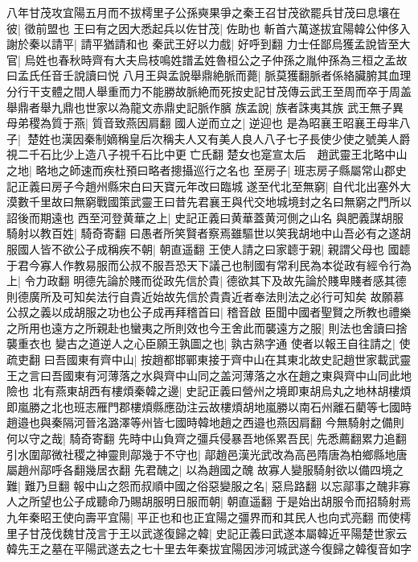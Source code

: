 八年甘茂攻宜陽五月而不拔樗里子公孫奭果爭之秦王召甘茂欲罷兵甘茂曰息壤在彼|{
	徵前盟也
	}
王曰有之因大悉起兵以佐甘茂|{
	佐助也
	}
斬首六萬遂拔宜陽韓公仲侈入謝於秦以請平|{
	請平猶請和也
	}
秦武王好以力戲|{
	好呼到翻
	}
力士任鄙烏獲孟說皆至大官|{
	烏姓也春秋時齊有大夫烏枝鳴姓譜孟姓魯桓公之子仲孫之胤仲孫為三桓之孟故曰孟氏任音壬說讀曰悦
	}
八月王與孟說舉鼎絶脈而薨|{
	脈莫獲翻脈者係絡臟腑其血理分行干支體之間人舉重而力不能勝故脈絶而死按史記甘茂傳云武王至周而卒于周盖舉鼎者舉九鼎也世家以為龍文赤鼎史記脈作臏
	}
族孟說|{
	族者誅夷其族
	}
武王無子異母弟稷為質于燕|{
	質音致燕因肩翻
	}
國人逆而立之|{
	逆迎也
	}
是為昭襄王昭襄王母芈八子|{
	楚姓也漢因秦制嫡稱皇后次稱夫人又有美人良人八子七子長使少使之號美人爵視二千石比少上造八子視千石比中更亡氏翻
	}
楚女也寔宣太后　趙武靈王北略中山之地|{
	略地之師速而疾杜預曰略者摠攝巡行之名也
	}
至房子|{
	班志房子縣屬常山郡史記正義曰房子今趙州縣宋白曰天寶元年改曰臨城
	}
遂至代北至無窮|{
	自代北出塞外大漠數千里故曰無窮戰國策武靈王曰昔先君襄王與代交地城境封之名曰無窮之門所以詔後而期遠也
	}
西至河登黄華之上|{
	史記正義曰黄華蓋黄河側之山名
	}
與肥義謀胡服騎射以教百姓|{
	騎奇寄翻
	}
曰愚者所笑賢者察焉雖驅世以笑我胡地中山吾必有之遂胡服國人皆不欲公子成稱疾不朝|{
	朝直遥翻
	}
王使人請之曰家聼于親|{
	親謂父母也
	}
國聼于君今寡人作教易服而公叔不服吾恐天下議己也制國有常利民為本從政有經令行為上|{
	令力政翻
	}
明德先論於賤而從政先信於貴|{
	德欲其下及故先論於賤卑賤者感其德則德廣所及可知矣法行自貴近始故先信於貴貴近者奉法則法之必行可知矣
	}
故願慕公叔之義以成胡服之功也公子成再拜稽首曰|{
	稽音啟
	}
臣聞中國者聖賢之所教也禮樂之所用也遠方之所親赴也蠻夷之所則效也今王舍此而襲遠方之服|{
	則法也舍讀曰捨襲重衣也
	}
變古之道逆人之心臣願王孰圖之也|{
	孰古熟字通
	}
使者以報王自往請之|{
	使疏吏翻
	}
曰吾國東有齊中山|{
	按趙都邯鄲東接于齊中山在其東北故史記趙世家載武靈王之言曰吾國東有河薄落之水與齊中山同之盖河薄落之水在趙之東與齊中山同此地險也
	}
北有燕東胡西有樓煩秦韓之邊|{
	史記正義曰營州之境即東胡烏丸之地林胡樓煩即嵐勝之北也班志雁門郡樓煩縣應劭注云故樓煩胡地嵐勝以南石州離石藺等七國時趙邉也與秦隔河晉洺潞澤等州皆七國時韓地趙之西邉也燕因肩翻
	}
今無騎射之備則何以守之哉|{
	騎奇寄翻
	}
先時中山負齊之彊兵侵暴吾地係累吾民|{
	先悉薦翻累力追翻
	}
引水圍鄗微社稷之神靈則鄗幾于不守也|{
	鄗趙邑漢光武改為高邑隋唐為柏鄉縣地唐屬趙州鄗呼各翻幾居衣翻
	}
先君醜之|{
	以為趙國之醜
	}
故寡人變服騎射欲以備四境之難|{
	難乃旦翻
	}
報中山之怨而叔順中國之俗惡變服之名|{
	惡烏路翻
	}
以忘鄗事之醜非寡人之所望也公子成聽命乃賜胡服明日服而朝|{
	朝直遥翻
	}
于是始出胡服令而招騎射焉九年秦昭王使向壽平宜陽|{
	平正也和也正宜陽之彊界而和其民人也向式亮翻
	}
而使樗里子甘茂伐魏甘茂言于王以武遂復歸之韓|{
	史記正義曰武遂本屬韓近平陽楚世家云韓先王之墓在平陽武遂去之七十里去年秦拔宜陽因涉河城武遂今復歸之韓復音如字
	}
